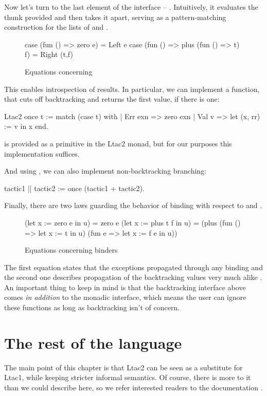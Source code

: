 Now let's turn to the last element of the interface -- .
Intuitively, it evaluates the thunk provided and then takes it apart, serving as a pattern-matching construction for the lists of  and .
\begin{figure}[H]
\begin{coq}
case (fun () => zero e) = Left e
case (fun () => plus (fun () => t) f) = Right (t,f)
\end{coq}
\caption{Equations concerning }
\label{fig:case_eq}
\end{figure}

This enables introspection of results.
In particular, we can implement a function, that cuts off backtracking and returns the first value, if there is one:
\begin{coq}
Ltac2 once t := match (case t) with
  | Err exn => zero exn
  | Val v => let (x, rr) := v in x
  end.
\end{coq}

 is provided as a primitive in the Ltac2 monad, but for our purposes this implementation suffices.

And using , we can also implement non-backtracking branching:
\begin{coq}
tactic1 || tactic2 := once (tactic1 + tactic2).
\end{coq}

Finally, there are two laws guarding the behavior of binding with respect to  and .
\begin{figure}[H]
\begin{coq}
(let x := zero e in u) = zero e
(let x := plus t f in u) = (plus (fun () => let x := t in u)
                                 (fun e => let x := f e in u))
\end{coq}
\caption{Equations concerning binders}
\label{fig:let_eq}
\end{figure}

The first equation states that the exceptions propagated through any binding and the second one describes propagation of the backtracking values very much alike .
An important thing to keep in mind is that the backtracking interface above comes \emph{in addition} to the monadic interface, which means the user can ignore these functions as long as backtracking isn't of concern.

\section{The rest of the language}
The main point of this chapter is that Ltac2 can be seen as a substitute for Ltac1, while keeping stricter informal semantics.
Of course, there is more to it than we could describe here, so we refer interested readers to the documentation \cite[Section 3.3.2]{thecoqdevelopmentteamCoqProofAssistant2020}.

